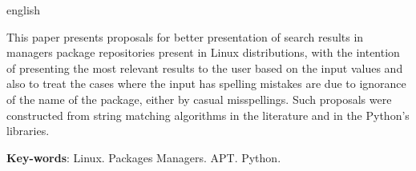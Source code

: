 \begin{resumo}[Abstract]
 \begin{otherlanguage*}{english}
   


This paper presents proposals for better presentation of search results in managers package repositories present in Linux distributions, with the intention of presenting the most relevant results to the user based on the input values and also to treat the cases where the input has spelling mistakes are due to ignorance of the name of the package, either by casual misspellings. Such proposals were constructed from string matching algorithms in the literature and in the Python's libraries.
   \vspace{\onelineskip}
 
   \noindent 
   \textbf{Key-words}: Linux. Packages Managers. APT. Python.
 \end{otherlanguage*}
\end{resumo}
